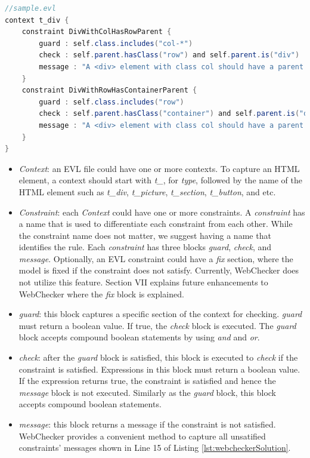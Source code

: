\documentclass[conference]{IEEETran}
\begin{document}
\begin{lstlisting}[language=Java, caption=Enforcing Bootstrap Grid Rule by Using WebChecker, label={lst:webcheckerSolution}]
//sample.evl
context t_div { 
    constraint DivWithColHasRowParent {
        guard : self.class.includes("col-*")
        check : self.parent.hasClass("row") and self.parent.is("div")
        message : "A <div> element with class col should have a parent <div> element with class row."
    }
    constraint DivWithRowHasContainerParent {
        guard : self.class.includes("row")
        check : self.parent.hasClass("container") and self.parent.is("div")
        message : "A <div> element with class col should have a parent <div> element with class row."
    }
}

\end{lstlisting}

\begin{itemize}
\item \textit{Context}: an EVL file could have one or more contexts. To capture an HTML element, a context should start with \textit{t\_}, for \textit{type}, followed by the name of the HTML element such as \textit{t\_div}, \textit{t\_picture}, \textit{t\_section}, \textit{t\_button}, and etc.
\item \textit{Constraint}: each \textit{Context} could have one or more constraints. A \textit{constraint} has a name that is used to differentiate each constraint from each other. While the constraint name does not matter, we suggest having a name that identifies the rule. Each \textit{constraint} has three blocks \textit{guard}, \textit{check}, and \textit{message}. Optionally, an EVL constraint could have a \textit{fix} section, where the model is fixed if the constraint does not satisfy. Currently, WebChecker does not utilize this feature. Section VII explains future enhancements to WebChecker where the \textit{fix} block is explained. 
\item \textit{guard}: this block captures a specific section of the context for checking. \textit{guard} must return a boolean value. If true, the \textit{check} block is executed. The \textit{guard} block accepts compound boolean statements by using \textit{and} and \textit{or}.      
\end{itemize}
\begin{itemize}
\item \textit{check}: after the \textit{guard} block is satisfied, this block is executed to \textit{check} if the constraint is satisfied. Expressions in this block must return a boolean value. If the expression returns true, the constraint is satisfied and hence the \textit{message} block is not executed. Similarly as the \textit{guard} block, this block accepts compound boolean statements.
\item \textit{message}: this block returns a message if the constraint is not satisfied. WebChecker provides a convenient method to capture all unsatified constraints' messages shown in Line 15 of Listing \ref{lst:webcheckerSolution}.  
\end{itemize}
\end{document}
